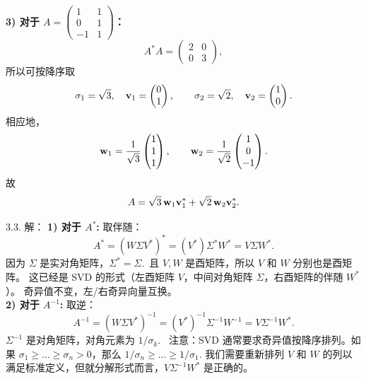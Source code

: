 \begin{exer}
\textbf{3) 对于 $A=\begin{pmatrix}1&1\\0&1\\-1&1\end{pmatrix}$：}
$$A^*A=\begin{pmatrix}2&0\\0&3\end{pmatrix},$$
所以可按降序取
$$\sigma_1=\sqrt3,\quad \mathbf{v}_1=\begin{pmatrix}0\\1\end{pmatrix},\qquad
\sigma_2=\sqrt2,\quad \mathbf{v}_2=\begin{pmatrix}1\\0\end{pmatrix}.$$
相应地，
$$\mathbf{w}_1=\frac1{\sqrt3}\begin{pmatrix}1\\1\\1\end{pmatrix},\qquad
\mathbf{w}_2=\frac1{\sqrt2}\begin{pmatrix}1\\0\\-1\end{pmatrix}.$$
故
$$A=\sqrt3\,\mathbf{w}_1\mathbf{v}_1^*+\sqrt2\,\mathbf{w}_2\mathbf{v}_2^*.$$

3.3. 解：
\textbf{1) 对于 $A^*$:}
取伴随：
$$ A^* = (W \Sigma V^*)^* = (V^*) \Sigma^* W^* = V \Sigma W^*. $$
因为 $\Sigma$ 是实对角矩阵，$\Sigma^* = \Sigma$.~且 $V, W$ 是酉矩阵，所以 $V$ 和 $W$ 分别也是酉矩阵。
这已经是 SVD 的形式（左酉矩阵 $V$，中间对角矩阵 $\Sigma$，右酉矩阵的伴随 $W^*$）。
奇异值不变，左/右奇异向量互换。
\\
\textbf{2) 对于 $A^{-1}$:}
取逆：
$$ A^{-1} = (W \Sigma V^*)^{-1} = (V^*)^{-1} \Sigma^{-1} W^{-1} = V \Sigma^{-1} W^*. $$
$\Sigma^{-1}$ 是对角矩阵，对角元素为 $1/\sigma_k$.~
注意：SVD 通常要求奇异值按降序排列。如果 $\sigma_1 \ge \dots \ge \sigma_n > 0$，那么 $1/\sigma_n \ge \dots \ge 1/\sigma_1$.
我们需要重新排列 $V$ 和 $W$ 的列以满足标准定义，但就分解形式而言，$V \Sigma^{-1} W^*$ 是正确的。


\end{exer}
